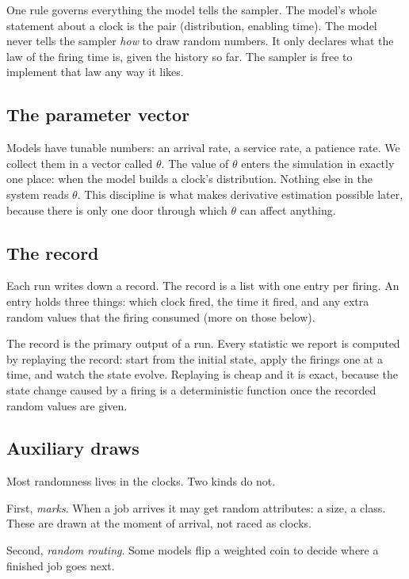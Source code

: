 \documentclass[11pt]{article}
\begin{document}
One rule governs everything the model tells the sampler. The model's whole
statement about a clock is the pair (distribution, enabling time). The
model never tells the sampler \emph{how} to draw random numbers. It only
declares what the law of the firing time is, given the history so far. The
sampler is free to implement that law any way it likes.

\subsection{The parameter vector}

Models have tunable numbers: an arrival rate, a service rate, a patience
rate. We collect them in a vector called $\theta$. The value of $\theta$
enters the simulation in exactly one place: when the model builds a clock's
distribution. Nothing else in the system reads $\theta$. This discipline is
what makes derivative estimation possible later, because there is only one
door through which $\theta$ can affect anything.

\subsection{The record}

Each run writes down a record. The record is a list with one entry per
firing. An entry holds three things: which clock fired, the time it fired,
and any extra random values that the firing consumed (more on those below).

The record is the primary output of a run. Every statistic we report is
computed by replaying the record: start from the initial state, apply the
firings one at a time, and watch the state evolve. Replaying is cheap and
it is exact, because the state change caused by a firing is a deterministic
function once the recorded random values are given.

\subsection{Auxiliary draws}

Most randomness lives in the clocks. Two kinds do not.

First, \emph{marks}. When a job arrives it may get random attributes: a
size, a class. These are drawn at the moment of arrival, not raced as
clocks.

Second, \emph{random routing}. Some models flip a weighted coin to decide
where a finished job goes next.
\end{document}
